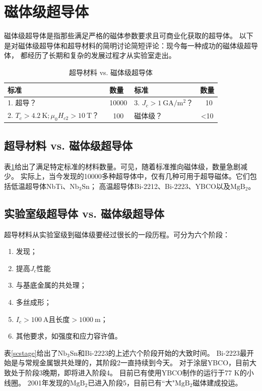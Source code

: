 \section{磁体级超导体}
磁体级超导体是指那些满足严格的磁体参数要求且可商业化获取的超导体。
以下是对磁体级超导体和超导材料的简明讨论简短评论：现今每一种成功的磁体级超导体，
都经历了长期和复杂的发展过程才从实验室走出。
\begin{table}[htbp]\small
  \centering
  \caption{超导材料 vs. 磁体级超导体} \label{scmaterialvsconductor}
\begin{tabular}{|l|c||l|c|}
  \hline
  标准 & 数量 & 标准 & 数量 \\ \hline \hline
  1. 超导？ & ~10000 & 3. $J_c>1\ \mathrm{GA/m^2}$？ & ~10 \\ \hline
  2. $T_c> 4.2\ \mathrm{K};\mu_0 H_{c2}>10\ \mathrm{T}$？ &~100 & 磁体级？ & <10 \\
  \hline
\end{tabular}
\end{table}

\subsection{超导材料 vs. 磁体级超导体}
表\ref{scmaterialvsconductor}给出了满足特定标准的材料数量。可见，随着标准推向磁体级，数量急剧减少。
实际上，当今发现的10000多种超导体中，仅有几种可用于超导磁体。它们包括低温超导体NbTi、$\mathrm{Nb_3Sn}$；
高温超导体Bi-2212、Bi-2223、YBCO以及$\mathrm{MgB_2}$。

\subsection{实验室级超导体 vs. 磁体级超导体}
超导材料从实验室级到磁体级要经过很长的一段历程。可分为六个阶段：
\begin{enumerate}
  \item 发现；
  \item 提高$J_c$性能
  \item 与基底金属的共处理；
  \item 多丝成形；
  \item $I_c>100\ \mathrm{A}$且长度$>1000\ \mathrm{m}$；
  \item 其他要求，如强度和应力容许值。
\end{enumerate}

表\ref{scstage}给出了$\mathrm{Nb_3Sn}$和Bi-2223的上述六个阶段开始的大致时间。
Bi-2223最开始是与常规金属银共处理的，其阶段2一直持续到今天。
对于涂层YBCO，目前大致处于阶段3晚期，即将进入阶段4。
目前已有使用YBCO制作的运行于77 K的小线圈。
2001年发现的$\mathrm{MgB_2}$已进入阶段5，目前已有``大"$\mathrm{MgB_2}$磁体建成投运。

